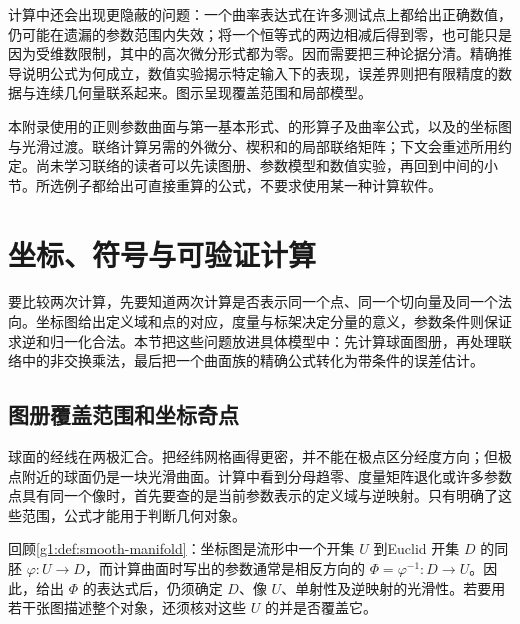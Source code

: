 \ProseParagraphBreak

计算中还会出现更隐蔽的问题：一个曲率表达式在许多测试点上都给出正确数值，仍可能在遗漏的参数范围内失效；将一个恒等式的两边相减后得到零，也可能只是因为受维数限制，其中的高次微分形式都为零。因而需要把三种论据分清。精确推导说明公式为何成立，数值实验揭示特定输入下的表现，误差界则把有限精度的数据与连续几何量联系起来。图示呈现覆盖范围和局部模型。

\ProseParagraphBreak

本附录使用的正则参数曲面与第一基本形式、的形算子及曲率公式，以及的坐标图与光滑过渡。联络计算另需的外微分、楔积和的局部联络矩阵；下文会重述所用约定。尚未学习联络的读者可以先读图册、参数模型和数值实验，再回到中间的小节。所选例子都给出可直接重算的公式，不要求使用某一种计算软件。

\section{坐标、符号与可验证计算}
\label{g1:sec:C01}

要比较两次计算，先要知道两次计算是否表示同一个点、同一个切向量及同一个法向。坐标图给出定义域和点的对应，度量与标架决定分量的意义，参数条件则保证求逆和归一化合法。本节把这些问题放进具体模型中：先计算球面图册，再处理联络中的非交换乘法，最后把一个曲面族的精确公式转化为带条件的误差估计。

\subsection{图册覆盖范围和坐标奇点}
\label{g1:subsec:C01:01}

球面的经线在两极汇合。把经纬网格画得更密，并不能在极点区分经度方向；但极点附近的球面仍是一块光滑曲面。计算中看到分母趋零、度量矩阵退化或许多参数点具有同一个像时，首先要查的是当前参数表示的定义域与逆映射。只有明确了这些范围，公式才能用于判断几何对象。

\ProseParagraphBreak

回顾\cref{g1:def:smooth-manifold}：坐标图是流形中一个开集 \(U\) 到Euclid 开集 \(D\) 的同胚 \(\varphi:U\rightarrow D\)，而计算曲面时写出的参数通常是相反方向的 \(\Phi=\varphi^{-1}:D\rightarrow U\)。因此，给出 \(\Phi\) 的表达式后，仍须确定 \(D\)、像 \(U\)、单射性及逆映射的光滑性。若要用若干张图描述整个对象，还须核对这些 \(U\) 的并是否覆盖它。

